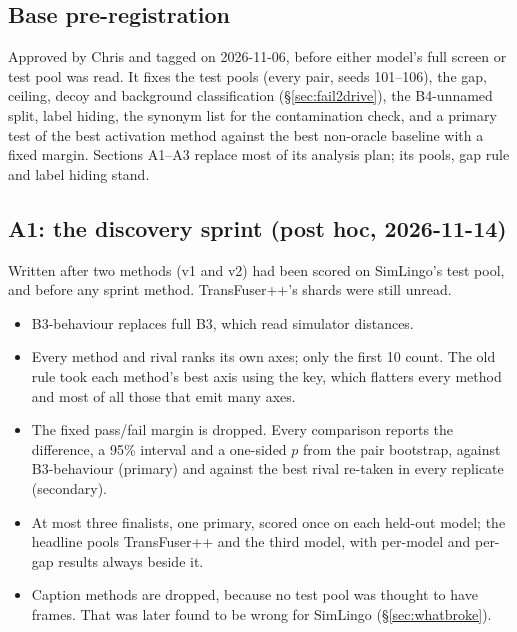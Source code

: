 \subsection{Base pre-registration}

Approved by Chris and tagged  on 2026-11-06, before either
model's full screen or test pool was read. It fixes the test pools (every pair,
seeds 101--106), the gap, ceiling, decoy and background classification
(\S\ref{sec:fail2drive}), the B4-unnamed split, label hiding, the synonym list for
the contamination check, and a primary test of the best activation method against
the best non-oracle baseline with a fixed margin. Sections A1--A3 replace most of
its analysis plan; its pools, gap rule and label hiding stand.

\subsection{A1: the discovery sprint (post hoc, 2026-11-14)}

Written after two methods (v1 and v2) had been scored on SimLingo's test pool,
and before any sprint method. TransFuser++'s shards were still unread.
\begin{itemize}
  \item B3-behaviour replaces full B3, which read simulator distances.
  \item Every method and rival ranks its own axes; only the first 10 count. The
        old rule took each method's best axis using the key, which flatters
        every method and most of all those that emit many axes.
  \item The fixed pass/fail margin is dropped. Every comparison reports the
        difference, a 95\% interval and a one-sided $p$ from the pair bootstrap,
        against B3-behaviour (primary) and against the best rival re-taken in
        every replicate (secondary).
  \item At most three finalists, one primary, scored once on each held-out
        model; the headline pools TransFuser++ and the third model, with
        per-model and per-gap results always beside it.
  \item Caption methods are dropped, because no test pool was thought to have
        frames. That was later found to be wrong for SimLingo
        (\S\ref{sec:whatbroke}).
\end{itemize}

